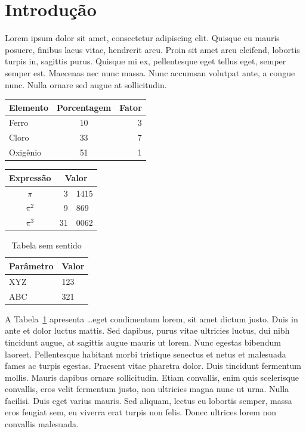 \documentclass{article}
\begin{document}
	\section{Introdução}
	
	Lorem ipsum dolor sit amet, consectetur adipiscing elit. Quisque eu mauris posuere, finibus lacus vitae, hendrerit arcu. Proin sit amet arcu eleifend, lobortis turpis in, sagittis purus. Quisque mi ex, pellentesque eget tellus eget, semper semper est. Maecenas nec nunc massa. Nunc accumsan volutpat ante, a congue nunc. Nulla ornare sed augue at sollicitudin.
	\vspace{1cm}
	
	\begin{center}
		\begin{tabular}{l|c|r}
		\hline
		Elemento & Porcentagem & Fator \\
		\hline\hline
		Ferro & 10 & 3 \\ \hline
		Cloro & 33 & 7 \\ \hline
		Oxigênio & 51 & 1 \\ \hline
	\end{tabular}
	\end{center}

\vspace{1cm}

\begin{center}
	\begin{tabular}{c r @{,}l}
	Expressão & \multicolumn{2}{c}{Valor} \\ \hline
	$\pi$ & 3 & 1415 \\
	$\pi^2$ & 9 & 869 \\
	$\pi^3$ & 31 & 0062
\end{tabular}
\end{center}

\vspace{1cm}
	
	\begin{table}[h]
		\caption{Tabela sem sentido} \label{tab:semsentido}
		\centering
		\begin{tabular}{l|l} \hline
			Parâmetro & Valor \\ \hline\hline
			XYZ & 123 \\
			ABC & 321 \\ \hline
		\end{tabular}
	\end{table}
\vspace{1cm}

	A Tabela~\ref{tab:semsentido} apresenta \dots eget condimentum lorem, sit amet dictum justo. Duis in ante et dolor luctus mattis. Sed dapibus, purus vitae ultricies luctus, dui nibh tincidunt augue, at sagittis augue mauris ut lorem. Nunc egestas bibendum laoreet. Pellentesque habitant morbi tristique senectus et netus et malesuada fames ac turpis egestas. Praesent vitae pharetra dolor. Duis tincidunt fermentum mollis. Mauris dapibus ornare sollicitudin. Etiam convallis, enim quis scelerisque convallis, eros velit fermentum justo, non ultricies magna nunc ut urna. Nulla facilisi. Duis eget varius mauris. Sed aliquam, lectus eu lobortis semper, massa eros feugiat sem, eu viverra erat turpis non felis. Donec ultrices lorem non convallis malesuada.
	
\end{document}

